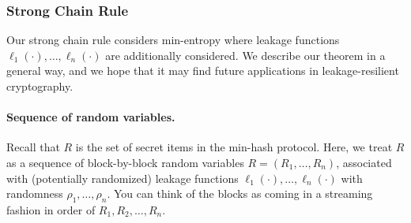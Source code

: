 
\subsubsection{Strong Chain Rule}\label{sec:strong-chain-rule}

Our strong chain rule considers min-entropy where leakage functions
$\ell_1(\cdot), \ldots, \ell_n(\cdot)$ are additionally considered. We describe
our theorem in a general way, and we hope that it may find future applications
in leakage-resilient cryptography.

\paragraph{Sequence of random variables.}
Recall that $R$ is the set of secret items in the min-hash protocol. Here, we
treat $R$ as a sequence of block-by-block random variables $R = (R_1,\dots,R_n)$, associated with 
(potentially randomized) leakage functions $\ell_1(\cdot), \ldots,
\ell_n(\cdot)$ with randomness $\rho_1, \ldots, \rho_n$. %
You can think of the blocks as coming in a streaming fashion in order of $R_1, R_{2}, \ldots, R_n$. 


